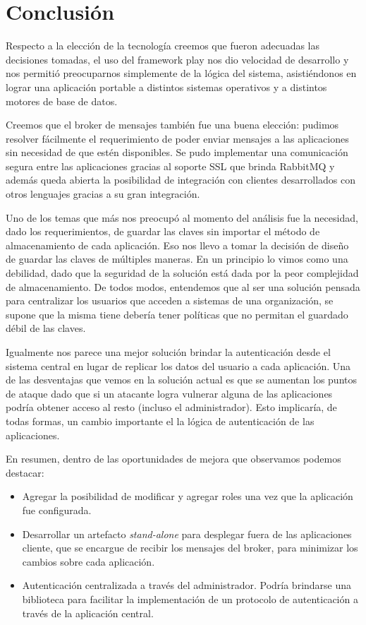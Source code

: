 \section{Conclusión}

Respecto a la elección de la tecnología creemos que fueron adecuadas las decisiones tomadas, el uso del framework play nos dio velocidad de desarrollo y nos permitió preocuparnos simplemente de la lógica del sistema, asistiéndonos en lograr una aplicación portable a distintos sistemas operativos y a distintos motores de base de datos.

Creemos que el broker de mensajes también fue una buena elección: pudimos resolver fácilmente el requerimiento de poder enviar mensajes a las aplicaciones sin necesidad de que estén disponibles. Se pudo implementar una comunicación segura entre las aplicaciones gracias al soporte SSL que brinda RabbitMQ y además queda abierta la posibilidad de integración con clientes desarrollados con otros lenguajes gracias a su gran integración.

Uno de los temas que más nos preocupó al momento del análisis fue la necesidad, dado los requerimientos, de guardar las claves sin importar el método de almacenamiento de cada aplicación. Eso nos llevo a tomar la decisión de diseño de guardar las claves de múltiples maneras. En un principio lo vimos como una debilidad, dado que la seguridad de la solución está dada por la peor complejidad de almacenamiento. De todos modos, entendemos que al ser una solución pensada para centralizar los usuarios que acceden a sistemas de una organización, se supone que la misma tiene debería tener políticas que no permitan el guardado débil de las claves.

Igualmente nos parece una mejor solución brindar la autenticación desde el sistema central en lugar de replicar los datos del usuario a cada aplicación. Una de las desventajas que vemos en la solución actual es que se aumentan los puntos de ataque dado que si un atacante logra vulnerar alguna de las aplicaciones podría obtener acceso al resto (incluso el administrador). Esto implicaría, de todas formas, un cambio importante el la lógica de autenticación de las aplicaciones.

En resumen, dentro de las oportunidades de mejora que observamos podemos destacar:

\begin{itemize}
  \item Agregar la posibilidad de modificar y agregar roles una vez que la aplicación fue configurada.
  \item Desarrollar un artefacto \textit{stand-alone} para desplegar fuera de las aplicaciones cliente, que se
  		encargue de recibir los mensajes del broker, para minimizar los cambios sobre cada aplicación.
  \item Autenticación centralizada a través del administrador. Podría brindarse una biblioteca para facilitar
  		la implementación de un protocolo de autenticación a través de la aplicación central.
\end{itemize}

